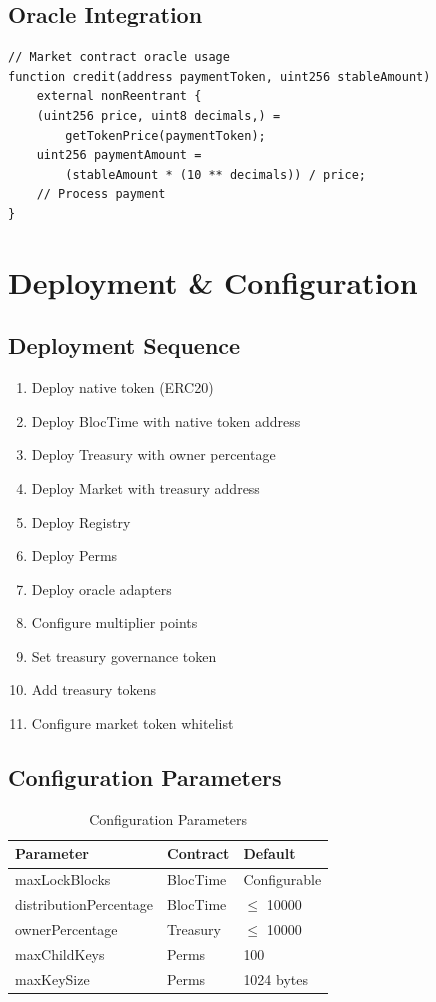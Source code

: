 \documentclass[11pt,a4paper]{article}
\begin{document}
\subsection{Oracle Integration}

\begin{lstlisting}
// Market contract oracle usage
function credit(address paymentToken, uint256 stableAmount) 
    external nonReentrant {
    (uint256 price, uint8 decimals,) = 
        getTokenPrice(paymentToken);
    uint256 paymentAmount = 
        (stableAmount * (10 ** decimals)) / price;
    // Process payment
}
\end{lstlisting}

\section{Deployment \& Configuration}

\subsection{Deployment Sequence}
\begin{enumerate}
\item Deploy native token (ERC20)
\item Deploy BlocTime with native token address
\item Deploy Treasury with owner percentage
\item Deploy Market with treasury address
\item Deploy Registry
\item Deploy Perms
\item Deploy oracle adapters
\item Configure multiplier points
\item Set treasury governance token
\item Add treasury tokens
\item Configure market token whitelist
\end{enumerate}

\subsection{Configuration Parameters}

\begin{table}[h]
\centering
\begin{tabular}{|l|l|l|}
\hline
\textbf{Parameter} & \textbf{Contract} & \textbf{Default} \\
\hline
maxLockBlocks & BlocTime & Configurable \\
distributionPercentage & BlocTime & $\leq$ 10000 \\
ownerPercentage & Treasury & $\leq$ 10000 \\
maxChildKeys & Perms & 100 \\
maxKeySize & Perms & 1024 bytes \\
\hline
\end{tabular}
\caption{Configuration Parameters}
\end{table}
\end{document}
